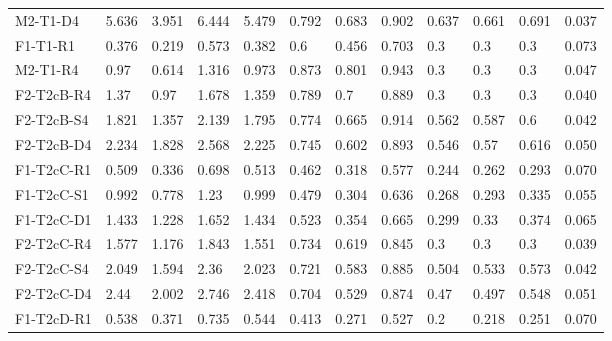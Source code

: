 \begin{table}[ht]
\begin{tabular}{llllllllllll}
  M2-T1-D4 & 5.636 & 3.951 & 6.444 & 5.479 & 0.792 & 0.683 & 0.902 & 0.637 & 0.661 & 0.691 & 0.037 \\ 
  F1-T1-R1 & 0.376 & 0.219 & 0.573 & 0.382 & 0.6 & 0.456 & 0.703 & 0.3 & 0.3 & 0.3 &    0.073  \\ 
  M2-T1-R4 & 0.97 & 0.614 & 1.316 & 0.973 & 0.873 & 0.801 & 0.943 & 0.3 & 0.3 & 0.3 &    0.047  \\ 
  F2-T2cB-R4 & 1.37 & 0.97 & 1.678 & 1.359 & 0.789 & 0.7 & 0.889 & 0.3 & 0.3 & 0.3 &    0.040  \\ 
  F2-T2cB-S4 & 1.821 & 1.357 & 2.139 & 1.795 & 0.774 & 0.665 & 0.914 & 0.562 & 0.587 & 0.6 &    0.042  \\ 
  F2-T2cB-D4 & 2.234 & 1.828 & 2.568 & 2.225 & 0.745 & 0.602 & 0.893 & 0.546 & 0.57 & 0.616 &    0.050  \\ 
  F1-T2cC-R1 & 0.509 & 0.336 & 0.698 & 0.513 & 0.462 & 0.318 & 0.577 & 0.244 & 0.262 & 0.293 &    0.070  \\ 
  F1-T2cC-S1 & 0.992 & 0.778 & 1.23 & 0.999 & 0.479 & 0.304 & 0.636 & 0.268 & 0.293 & 0.335 &    0.055  \\ 
  F1-T2cC-D1 & 1.433 & 1.228 & 1.652 & 1.434 & 0.523 & 0.354 & 0.665 & 0.299 & 0.33 & 0.374 &    0.065  \\ 
  F2-T2cC-R4 & 1.577 & 1.176 & 1.843 & 1.551 & 0.734 & 0.619 & 0.845 & 0.3 & 0.3 & 0.3 &    0.039  \\ 
  F2-T2cC-S4 & 2.049 & 1.594 & 2.36 & 2.023 & 0.721 & 0.583 & 0.885 & 0.504 & 0.533 & 0.573 &    0.042  \\ 
  F2-T2cC-D4 & 2.44 & 2.002 & 2.746 & 2.418 & 0.704 & 0.529 & 0.874 & 0.47 & 0.497 & 0.548 &    0.051  \\ 
  F1-T2cD-R1 & 0.538 & 0.371 & 0.735 & 0.544 & 0.413 & 0.271 & 0.527 & 0.2 & 0.218 & 0.251 &    0.070  \\ 
   \hline
\end{tabular}
\end{table}
